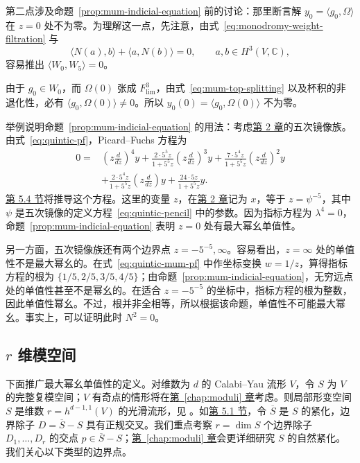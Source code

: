 第二点涉及命题~\ref{prop:mum-indicial-equation} 前的讨论：那里断言解 $y_0=\langle g_0,\Omega\rangle$ 在 $z=0$ 处不为零。为理解这一点，先注意，由式~\eqref{eq:monodromy-weight-filtration} 与
\[
\langle N(a),b\rangle+\langle a,N(b)\rangle=0,
\qquad a,b\in H^3(V,\mathbb C),
\]
容易推出 $\langle W_0,W_5\rangle=0$。

由于 $g_0\in W_0$，而 $\Omega(0)$ 张成 $F_{\mathrm{lim}}^3$，由式~\eqref{eq:mum-top-splitting} 以及杯积的非退化性，必有 $\langle g_0,\Omega(0)\rangle\ne0$。所以 $y_0(0)=\langle g_0,\Omega(0)\rangle$ 不为零。

举例说明命题~\ref{prop:mum-indicial-equation} 的用法：考虑\hyperref[chap:quintic]{第 2 章}的五次镜像族。由式~\eqref{eq:quintic-pf}，Picard--Fuchs 方程为
\begin{equation}\label{eq:quintic-mum-pf}
\begin{aligned}
0={}&\left(z\frac d{dz}\right)^4y
+\frac{2\cdot5^5z}{1+5^5z}\left(z\frac d{dz}\right)^3y
+\frac{7\cdot5^4z}{1+5^5z}\left(z\frac d{dz}\right)^2y\\
&+\frac{2\cdot5^4z}{1+5^5z}\left(z\frac d{dz}\right)y
+\frac{24\cdot5z}{1+5^5z}y.
\end{aligned}
\end{equation}
\hyperref[sec:hodge-examples]{第 5.4 节}将推导这个方程。这里的变量 $z$，在\hyperref[chap:quintic]{第 2 章}记为 $x$，等于 $z=\psi^{-5}$，其中 $\psi$ 是五次镜像的定义方程~\eqref{eq:quintic-pencil} 中的参数。因为指标方程为 $\lambda^4=0$，命题~\ref{prop:mum-indicial-equation} 表明 $z=0$ 处有最大幂幺单值性。

另一方面，五次镜像族还有两个边界点 $z=-5^{-5},\infty$。容易看出，$z=\infty$ 处的单值性不是最大幂幺的。在式~\eqref{eq:quintic-mum-pf} 中作坐标变换 $w=1/z$，算得指标方程的根为 $\{1/5,2/5,3/5,4/5\}$；由命题~\ref{prop:mum-indicial-equation}，无穷远点处的单值性甚至不是幂幺的。在适合 $z=-5^{-5}$ 的坐标中，指标方程的根为整数，因此单值性幂幺。不过，根并非全相等，所以根据该命题，单值性不可能最大幂幺。事实上，可以证明此时 $N^2=0$。

\subsection{$r$ 维模空间}\label{subsec:higher-dimensional-mum}

下面推广最大幂幺单值性的定义。对维数为 $d$ 的 Calabi--Yau 流形 $V$，令 $S$ 为 $V$ 的完整复模空间；$V$ 有奇点的情形将在\hyperref[chap:moduli]{第~\ref*{chap:moduli} 章}考虑。则局部形变空间 $S$ 是维数 $r=h^{d-1,1}(V)$ 的光滑流形，见 。如\hyperref[sec:hodge-theory]{第 5.1 节}，令 $\overline S$ 是 $S$ 的紧化，边界除子 $D=\overline S-S$ 具有正规交叉。我们重点考察 $r=\dim S$ 个边界除子 $D_1,\ldots,D_r$ 的交点 $p\in\overline S-S$；\hyperref[chap:moduli]{第~\ref*{chap:moduli} 章}会更详细研究 $S$ 的自然紧化。我们关心以下类型的边界点。

